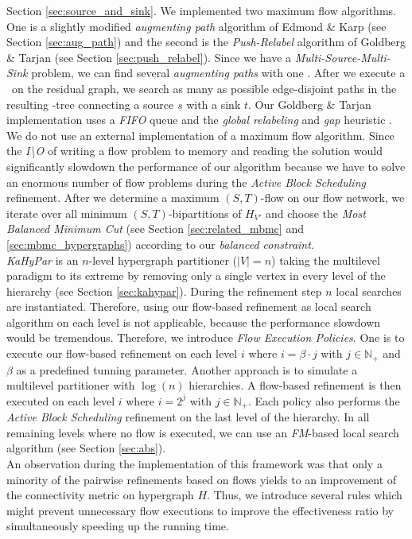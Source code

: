 Section \ref{sec:source_and_sink}. We implemented two maximum flow algorithms.
One is a slightly modified \emph{augmenting path} algorithm of Edmond \& Karp
\cite{edmonds1972theoretical} (see Section \ref{sec:aug_path}) 
and the second is the \emph{Push-Relabel} algorithm of
Goldberg \& Tarjan \cite{cherkassky1997implementing,goldberg1988new} 
(see Section \ref{sec:push_relabel}). Since we have a 
\emph{Multi-Source-Multi-Sink} problem, we can find several \emph{augmenting paths}
with one \BFS. After we execute a \BFS~on the residual graph, we search 
as many as possible edge-disjoint paths in the resulting \BFS-tree connecting a source $s$
with a sink $t$. Our Goldberg \& Tarjan implementation uses a \emph{FIFO} queue and
the \emph{global relabeling} and \emph{gap} heuristic \cite{cherkassky1997implementing}.
We do not use an external implementation of a maximum flow algorithm.
Since the \emph{I\textbackslash O} of writing a flow problem to memory and reading the
solution would significantly slowdown the performance of our algorithm because we have
to solve an enormous number of flow problems during the \emph{Active Block Scheduling}
refinement. After we determine a maximum $(S,T)$-flow on our flow network, we iterate over
all minimum $(S,T)$-bipartitions of $H_{V'}$ \cite{picard1980structure} and choose 
the \emph{Most Balanced Minimum Cut} (see Section \ref{sec:related_mbmc} and 
\ref{sec:mbmc_hypergraphs}) according to our \emph{balanced constraint}. \\
\emph{KaHyPar} is an $n$-level hypergraph partitioner ($|V| = n$) taking the 
multilevel paradigm to its extreme by removing only a single vertex in every level
of the hierarchy \cite{akhremtsev2017engineering} (see Section \ref{sec:kahypar}). 
During the refinement step $n$ local searches are instantiated. Therefore, 
using our flow-based refinement as local search algorithm on each level is not 
applicable, because the performance slowdown would be tremendous. Therefore,
we introduce \emph{Flow Execution Policies}. One is to execute our flow-based
refinement on each level $i$ where $i = \beta\cdot j$ with $j \in \mathbb{N}_+$ and
$\beta$ as a predefined tunning parameter. Another approach is to simulate a
multilevel partitioner with $\log(n)$ hierarchies. A flow-based refinement is then
executed on each level $i$ where $i = 2^j$ with $j \in \mathbb{N}_+$. Each policy also
performs the \emph{Active Block Scheduling} refinement on the last level of the
hierarchy. In all remaining levels where no flow is executed, we can use an 
\emph{FM}-based local search algorithm 
\cite{akhremtsev2017engineering,fiduccia1988linear,sanchis1989multiple} (see Section 
\ref{sec:abs}). \\
An observation during the implementation of this framework was that only a minority
of the pairwise refinements based on flows yields to an improvement of the connectivity
metric on hypergraph $H$. Thus, we introduce several rules which might prevent
unnecessary flow executions to improve the effectiveness ratio by simultaneously speeding up
the running time.

